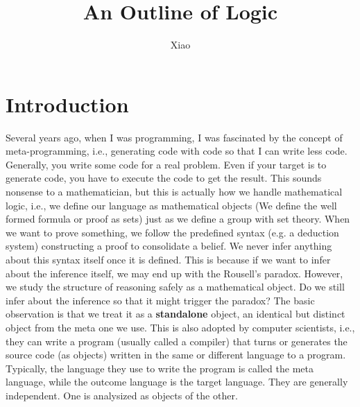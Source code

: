 \documentclass[12pt,a4paper]{report}
\begin{document}
\title{An Outline of Logic}
\author{Xiao}
\date{}
\maketitle

\tableofcontents

\chapter*{Introduction}

Several years ago, when I was programming, I was fascinated
by the concept of meta-programming, i.e., generating code with code
so that I can write less code. Generally, you write some code for
a real problem. Even if your target is to generate code, you have
to execute the code to get the result. This sounds nonsense to a 
mathematician, but this is actually how we handle mathematical 
logic, i.e., we define our language as mathematical objects 
(We define the well formed formula or proof as sets) 
just as we define a group with set theory. When we want to prove
something, we follow the predefined syntax (e.g. a deduction system)
constructing a proof to consolidate a belief. We never infer anything
about this syntax itself once it is defined. This is because if we
want to infer about the inference itself, we may end up with the 
Rousell's paradox. However, we study the structure of reasoning
safely as a mathematical object. Do we still infer about the inference
so that it might trigger the paradox? The basic observation is that 
we treat it as a {\bf standalone} object, an identical but distinct 
object from the meta one we use. This is also adopted by 
computer scientists, i.e., they can write a program (usually called 
a compiler) that turns or generates the source code (as objects) 
written in the same or different language to a program. Typically, 
the language they use to write the program is called the meta language, 
while the outcome language is the target language. They are generally 
independent. One is analysized as objects of the other. 
\end{document}
